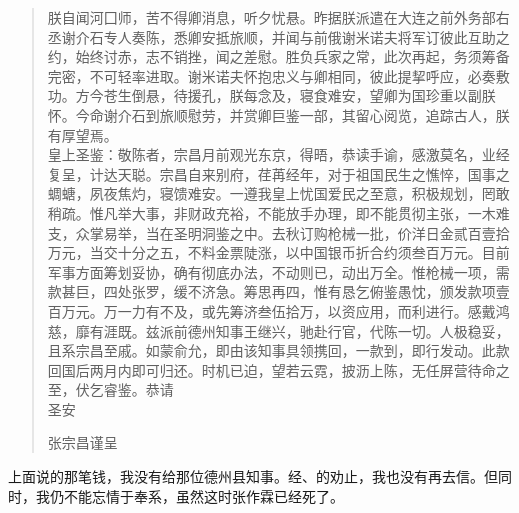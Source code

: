 \begin{quote}
	朕自闻河囗师，苦不得卿消息，听夕忧悬。昨据朕派遣在大连之前外务部右丞谢介石专人奏陈，悉卿安抵旅顺，并闻与前俄谢米诺夫将军订彼此互助之约，始终讨赤，志不销挫，闻之差慰。胜负兵家之常，此次再起，务须筹备完密，不可轻率进取。谢米诺夫怀抱忠义与卿相同，彼此提挈呼应，必奏敷功。方今苍生倒悬，待援孔，朕每念及，寝食难安，望卿为国珍重以副朕怀。今命谢介石到旅顺慰劳，并赏卿巨鉴一部，其留心阅览，追踪古人，朕有厚望焉。\\

皇上圣鉴：敬陈者，宗昌月前观光东京，得晤，恭读手谕，感激莫名，业经复呈，计达天聪。宗昌自来别府，荏苒经年，对于祖国民生之憔悴，国事之蜩螗，夙夜焦灼，寝馈难安。一遵我皇上忧国爱民之至意，积极规划，罔敢稍疏。惟凡举大事，非财政充裕，不能放手办理，即不能贯彻主张，一木难支，众掌易举，当在圣明洞鉴之中。去秋订购枪械一批，价洋日金贰百壹拾万元，当交十分之五，不料金票陡涨，以中国银币折合约须叁百万元。目前军事方面筹划妥协，确有彻底办法，不动则已，动出万全。惟枪械一项，需款甚巨，四处张罗，缓不济急。筹思再四，惟有恳乞俯鉴愚忱，颁发款项壹百万元。万一力有不及，或先筹济叁伍拾万，以资应用，而利进行。感戴鸿慈，靡有涯既。兹派前德州知事王继兴，驰赴行官，代陈一切。人极稳妥，且系宗昌至戚。如蒙俞允，即由该知事具领携回，一款到，即行发动。此款回国后两月内即可归还。时机已迫，望若云霓，披沥上陈，无任屏营待命之至，伏乞睿鉴。恭请\\

圣安\\

\begin{flushright}
	张宗昌谨呈\\
\end{flushright}
\end{quote}

上面说的那笔钱，我没有给那位德州县知事。经、的劝止，我也没有再去信。但同时，我仍不能忘情于奉系，虽然这时张作霖已经死了。\\

